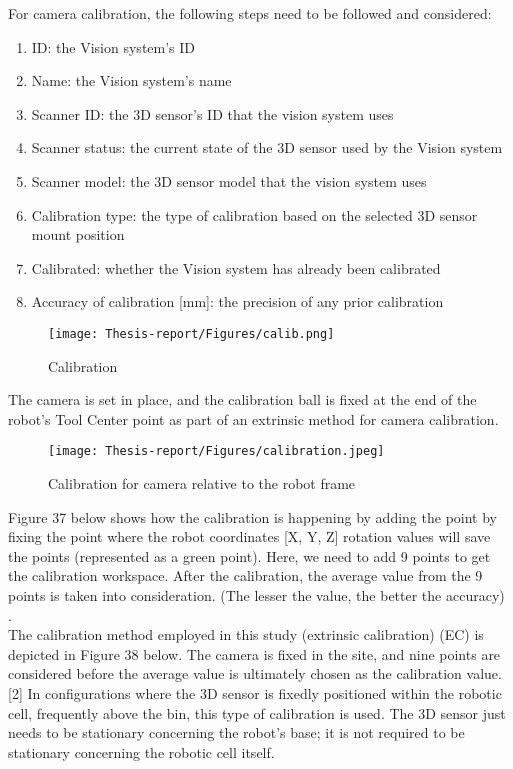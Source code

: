 \documentclass[12pt]{article}
\begin{document}
For camera calibration, the following steps need to be followed and considered: \cite{ref2}
\begin{enumerate}
    \item  ID: the Vision system's ID \cite{ref2}
    \item  Name: the Vision system's name \cite{ref2}
    \item  Scanner ID: the 3D sensor's ID that the vision system uses \cite{ref2}
    \item  Scanner status: the current state of the 3D sensor used by the Vision system\cite{ref2}
    \item  Scanner model: the 3D sensor model that the vision system uses \cite{ref2}
    \item  Calibration type: the type of calibration based on the selected 3D sensor mount position \cite{ref2}
    \item  Calibrated: whether the Vision system has already been calibrated \cite{ref2}
    \item  Accuracy of calibration [mm]: the precision of any prior calibration   \cite{ref2}
\end{enumerate}

\begin{figure}[h]
    \centering
    \texttt{[image: Thesis-report/Figures/calib.png]}
    \caption{Calibration \cite{ref2} }
    \label{fig:Photoneo Cmaera}
\end{figure}
The camera is set in place, and the calibration ball is fixed at the end of the robot's Tool Center point as part of an extrinsic method for camera calibration.\\
\begin{figure}[h]
    \centering
    \texttt{[image: Thesis-report/Figures/calibration.jpeg]}
    \caption{Calibration for camera relative to the robot frame\cite{ref2}} 
    \label{fig:Photoneo Cmaera}
\end{figure}
Figure 37 below shows how the calibration is happening by adding the point by fixing the point where the robot coordinates [X, Y, Z] rotation values will save the points (represented as a green point). Here, we need to add 9 points to get the calibration workspace. After the calibration, the average value from the 9 points is taken into consideration. (The lesser the value, the better the accuracy) \cite{ref2}.\\ 

The calibration method employed in this study (extrinsic calibration) (EC) is depicted in Figure 38 below. The camera is fixed in the site, and nine points are considered before the average value is ultimately chosen as the calibration value.  [2]  In configurations where the 3D sensor is fixedly positioned within the robotic cell, frequently above the bin, this type of calibration is used.  The 3D sensor just needs to be stationary concerning the robot's base; it is not required to be stationary concerning the robotic cell itself\cite{ref2}.\\ 
\end{document}
